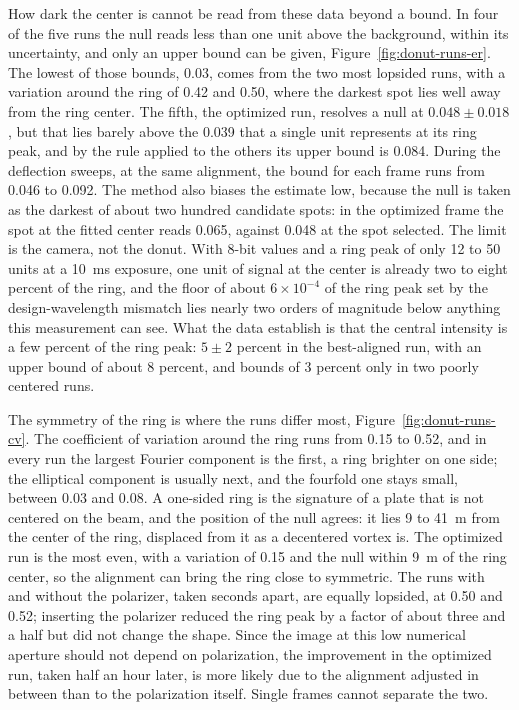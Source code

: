 \documentclass{article}
\begin{document}
How dark the center is cannot be read from these data beyond a bound. In four of the five runs the
null reads less than one unit above the background, within its uncertainty, and only an upper
bound can be given, Figure~\ref{fig:donut-runs-er}. The lowest of those bounds, 0.03, comes from
the two most lopsided runs, with a variation around the ring of 0.42 and 0.50, where the darkest
spot lies well away from the ring center. The fifth, the
optimized run, resolves a null at $0.048\pm0.018$, but that lies barely above the 0.039 that a single
unit represents at its ring peak, and by the rule applied to the others its upper bound is 0.084.
During the deflection sweeps, at the same alignment, the bound for each frame runs from 0.046 to
0.092. The method also biases the estimate low, because the null is taken as the darkest of about
two hundred candidate spots: in the optimized frame the spot at the fitted center reads 0.065,
against 0.048 at the spot selected. The limit is the camera, not the donut. With 8-bit values and a ring
peak of only 12 to 50 units at a 10~ms exposure, one unit of signal at the center is already two to
eight percent of the ring, and the floor of about $6\times10^{-4}$ of the ring peak set by the
design-wavelength mismatch lies nearly two orders of magnitude below anything this measurement can
see. What the data establish is that the central intensity is a few percent of the ring peak:
$5\pm2$ percent in the best-aligned run, with an upper bound of about 8 percent, and bounds of
3 percent only in two poorly centered runs.

The symmetry of the ring is where the runs differ most, Figure~\ref{fig:donut-runs-cv}. The
coefficient of variation around the ring runs from 0.15 to 0.52, and in every run the largest
Fourier component is the first, a ring brighter on one side; the elliptical component is usually
next, and the fourfold one stays small, between 0.03 and 0.08. A one-sided ring is the signature of a plate
that is not centered on the beam, and the position of the null agrees: it lies 9 to 41~\textmu m
from the center of the ring, displaced from it as a decentered vortex is. The optimized run is the
most even, with a variation of 0.15 and the null within 9~\textmu m of the ring center, so the
alignment can bring the ring close to symmetric. The runs with and without the polarizer, taken
seconds apart, are equally lopsided, at 0.50 and 0.52; inserting the polarizer reduced the ring
peak by a factor of about three and a half but did not change the shape. Since the image at this
low numerical aperture should not depend on polarization, the improvement in the optimized run,
taken half an hour later, is more likely due to the alignment adjusted in between than to the
polarization itself. Single frames cannot separate the two.
\end{document}
